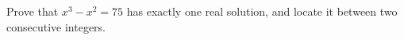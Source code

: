Prove that $x^3-x^2=75$ has exactly one real solution, and locate it between two consecutive integers.
